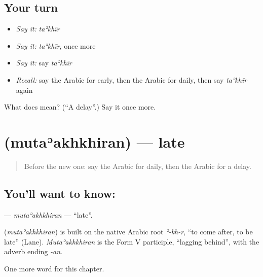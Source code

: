 \subsection*{Your turn}
\begin{itemize}
\raggedright
  \item \emph{Say it:} \emph{taʾkhīr}
  \item \emph{Say it:} \emph{taʾkhīr}, once more
  \item \emph{Say it:} say \emph{taʾkhīr}
  \item \emph{Recall:} say the Arabic for early, then the Arabic for daily, then say \emph{taʾkhīr} again
\end{itemize}

\begin{tcolorbox}[breakable,colback=teal!4,colframe=teal!35!black,title={Before you move on}]
What does  mean? (\textquotedblleft{}A delay\textquotedblright{}.) Say it once more.
\end{tcolorbox}
\section[\texorpdfstring{\ar{متأخرا} (mutaʾakhkhiran)}{متأخرا (mutaʾakhkhiran)}]{ (mutaʾakhkhiran) — late}

\label{lesson:AR-C170-mutaakhkhiran}



\begin{quote}
Before the new one: say the Arabic for daily, then the Arabic for a delay.
\end{quote}

\subsection*{You'll want to know: }
\textbf{} — \emph{mutaʾakhkhiran} — \textquotedblleft{}late\textquotedblright{}.

\begin{cousinweb}
\textbf{} (\emph{mutaʾakhkhiran}) is built on the native Arabic root \emph{ʾ-kh-r}, \textquotedblleft{}to come after, to be late\textquotedblright{} (Lane). \emph{Mutaʾakhkhiran} is the Form V participle, \textquotedblleft{}lagging behind\textquotedblright{}, with the adverb ending \emph{-an}.
\end{cousinweb}

\begin{grammarlens}[title={What you've built}]
One more word for this chapter.
\end{grammarlens}

